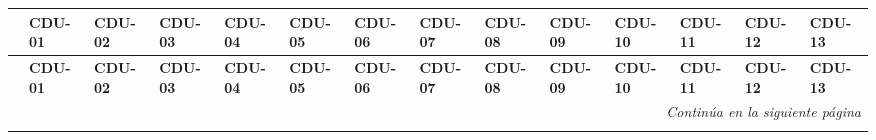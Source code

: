 \begin{center}
\begin{longtable}{ c | p{0.75cm} p{0.75cm} p{0.75cm} p{0.75cm} p{0.75cm} p{0.75cm} p{0.75cm} p{0.75cm} p{0.75cm} p{0.75cm} p{0.75cm} p{0.75cm} p{0.75cm} |}

	& \textbf{CDU-01} & \textbf{CDU-02} & \textbf{CDU-03} & \textbf{CDU-04} & \textbf{CDU-05} & \textbf{CDU-06} & \textbf{CDU-07} & \textbf{CDU-08} & \textbf{CDU-09} & \textbf{CDU-10} & \textbf{CDU-11} & \textbf{CDU-12} & \textbf{CDU-13} \\ \hline \hline
	\endfirsthead
	& \textbf{CDU-01} & \textbf{CDU-02} & \textbf{CDU-03} & \textbf{CDU-04} & \textbf{CDU-05} & \textbf{CDU-06} & \textbf{CDU-07} & \textbf{CDU-08} & \textbf{CDU-09} & \textbf{CDU-10} & \textbf{CDU-11} & \textbf{CDU-12} & \textbf{CDU-13} \\ \hline \hline
	\endhead

	\multicolumn{14}{r}{\textit{Continúa en la siguiente página}} \\
	\endfoot
	\endlastfoot


\end{longtable}
\end{center}
